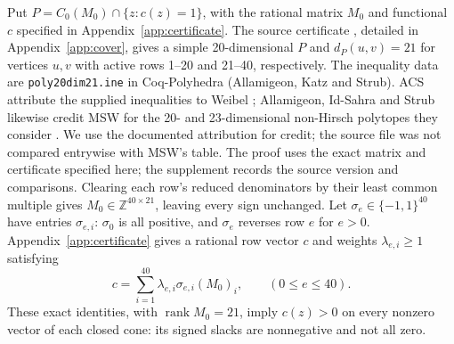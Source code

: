 \documentclass[11pt]{article}
\theoremstyle{remark}
\begin{document}
Put $P=C_0(M_0)\cap\{z:c(z)=1\}$, with the rational matrix $M_0$ and
functional $c$ specified in Appendix~\ref{app:certificate}.
The source certificate \cite{supplement}, detailed in Appendix~\ref{app:cover},
gives a simple 20-dimensional $P$ and $d_P(u,v)=21$ for vertices $u,v$
with active rows 1--20 and 21--40, respectively.
The inequality data are \texttt{poly20dim21.ine} in Coq-Polyhedra
(Allamigeon, Katz and Strub). ACS attribute the supplied inequalities
to Weibel \cite[\S5, PDF p.~11, footnote~6]{acs}; Allamigeon, Id-Sahra
and Strub likewise credit MSW for the 20- and 23-dimensional non-Hirsch
polytopes they consider \cite[\S1]{cert26}.
We use the documented attribution for credit; the source file was not compared
entrywise with MSW's table. The proof uses the exact matrix and certificate
specified here; the supplement records the source version and comparisons.
Clearing each row's reduced denominators by their least common multiple gives
$M_0\in\mathbb Z^{40\times21}$, leaving every sign unchanged.
Let
$\sigma_e\in\{-1,1\}^{40}$ have entries $\sigma_{e,i}$:
$\sigma_0$ is all positive, and $\sigma_e$ reverses row $e$ for $e>0$.
Appendix~\ref{app:certificate} gives a rational row vector $c$ and weights
$\lambda_{e,i}\ge1$ satisfying
\[
 c=\sum_{i=1}^{40}\lambda_{e,i}\sigma_{e,i}(M_0)_i,
 \qquad(0\le e\le40).
\]
These exact identities, with $\operatorname{rank}M_0=21$, imply
$c(z)>0$ on every nonzero vector of each closed cone: its signed slacks
are nonnegative and not all zero.
\end{document}

